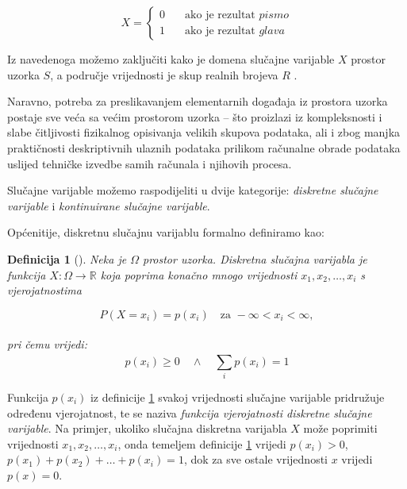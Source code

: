 \documentclass[a4paper,12pt,oneside]{memoir}
\newtheorem{definition}{Definicija}[chapter]
\begin{document}
                \begin{equation*}
                    X=\begin{cases}
                        0   &   \quad \text{ako je rezultat } \textit{pismo}\\
                        1   &   \quad \text{ako je rezultat } \textit{glava}
                    \end{cases}
                \end{equation*}
                
                Iz navedenoga možemo zaključiti kako je domena slučajne varijable $X$ prostor uzorka $S$, a područje vrijednosti je skup realnih brojeva $R$ \cite{Bahovec}.

                Naravno, potreba za preslikavanjem elementarnih događaja iz prostora uzorka postaje sve veća sa većim prostorom uzorka -- što proizlazi iz kompleksnosti i slabe čitljivosti fizikalnog opisivanja velikih skupova podataka, ali i zbog manjka praktičnosti deskriptivnih ulaznih podataka prilikom računalne obrade podataka uslijed tehničke izvedbe samih računala i njihovih procesa.

                Slučajne varijable možemo raspodijeliti u dvije kategorije: \textit{diskretne slučajne varijable} i \textit{kontinuirane slučajne varijable}.
                
                Općenitije, diskretnu slučajnu varijablu formalno definiramo kao:

                \begin{definition}[\cite{Dekking,Bahovec}]
                    Neka je $\Omega$ prostor uzorka. Diskretna slučajna varijabla je funkcija $X:\Omega\to\mathbb{R}$ koja poprima konačno mnogo vrijednosti $x_1,x_2,\ldots,x_i$ s vjerojatnostima

                    \begin{equation}
                        P(X=x_i)=p(x_i) \quad   \text{za } -\infty<x_i<\infty,
                    \end{equation}\\
                    pri čemu vrijedi:
                    \begin{equation*}
                        p(x_i)\geq 0 \quad \land \quad \displaystyle\sum_{i}^{}p(x_i)=1
                    \end{equation*}
                    \label{def:random_discrete_variable}
                \end{definition}

                Funkcija $p(x_i)$ iz definicije \ref{def:random_discrete_variable} svakoj vrijednosti slučajne varijable pridružuje određenu vjerojatnost, te se naziva \textit{funkcija vjerojatnosti diskretne slučajne varijable}. Na primjer, ukoliko slučajna diskretna varijabla $X$ može poprimiti vrijednosti $x_1,x_2,\ldots,x_i$, onda temeljem definicije \ref{def:random_discrete_variable} vrijedi $p(x_i)>0$, $p(x_1)+p(x_2)+\ldots+p(x_i)=1$, dok za sve ostale vrijednosti $x$ vrijedi $p(x)=0$.
\end{document}
